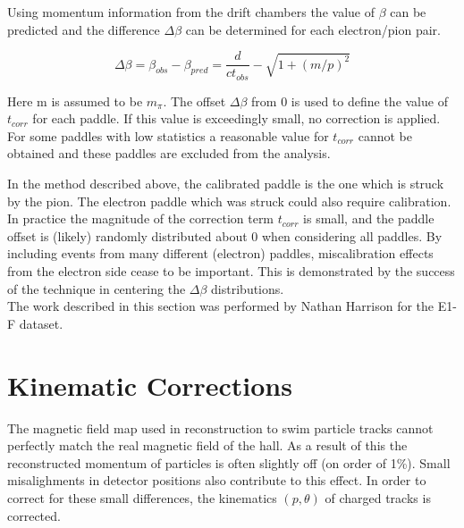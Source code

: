Using momentum information from the drift chambers the value of $\beta$ can be predicted and the difference $\Delta \beta$ can be determined for each electron/pion pair. 

\begin{equation}
	\Delta \beta = \beta_{obs} - \beta_{pred} = \frac{d}{c t_{obs}} - \sqrt{1+(m/p)^2} 
\end{equation} 

Here m is assumed to be $m_{\pi}$.  The offset $\Delta \beta$ from 0 is used to define the value of $t_{corr}$ for each paddle.  If this value is exceedingly small, no correction is applied.  For some paddles with low statistics a reasonable value for $t_{corr}$ cannot be obtained and these paddles are excluded from the analysis.  \\


In the method described above, the calibrated paddle is the one which is struck by the pion.  The electron paddle which was struck could also require calibration.  In practice the magnitude of the correction term $t_{corr}$ is small, and the paddle offset is (likely) randomly distributed about 0 when considering all paddles.  By including events from many different (electron) paddles, miscalibration effects from the electron side cease to be important.  This is demonstrated by the success of the technique in centering the $\Delta \beta$ distributions.  \\

The work described in this section was performed by Nathan Harrison for the E1-F dataset.

\section{Kinematic Corrections}
The magnetic field map used in reconstruction to swim particle tracks cannot perfectly match the real magnetic field of the hall.  As a result of this the reconstructed momentum of particles is often slightly off (on order of 1\%).  Small misalighments in detector positions also contribute to this effect.  In order to correct for these small differences, the kinematics $(p, \theta)$ of charged tracks is corrected. \\

